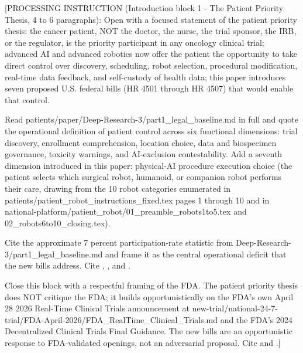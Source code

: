
[PROCESSING INSTRUCTION (Introduction block 1 - The Patient Priority
Thesis, 4 to 6 paragraphs): Open with a focused statement of the
patient priority thesis: the cancer patient, NOT the doctor, the
nurse, the trial sponsor, the IRB, or the regulator, is the priority
participant in any oncology clinical trial; advanced AI and advanced
robotics now offer the patient the opportunity to take direct control
over discovery, scheduling, robot selection, procedural modification,
real-time data feedback, and self-custody of health data; this paper
introduces seven proposed U.S. federal bills (HR 4501 through HR 4507)
that would enable that control.

Read patients/paper/Deep-Research-3/part1\_legal\_baseline.md in full
and quote the operational definition of patient control across six
functional dimensions: trial discovery, enrollment comprehension,
location choice, data and biospecimen governance, toxicity warnings,
and AI-exclusion contestability. Add a seventh dimension introduced
in this paper: physical-AI procedure execution choice (the patient
selects which surgical robot, humanoid, or companion robot performs
their care, drawing from the 10 robot categories enumerated in
patients/patient\_robot\_instructions\_fixed.tex pages 1 through 10 and
in national-platform/patient\_robot/01\_preamble\_robots1to5.tex and
02\_robots6to10\_closing.tex).

Cite the approximate 7 percent participation-rate statistic from
Deep-Research-3/part1\_legal\_baseline.md and frame it as the central
operational deficit that the new bills address. Cite
\cite{hhs_45cfr46_protection_human_subjects},
\cite{fda_informed_consent_guidance_2023}, and
\cite{fda_dct_guidance_2024}.

Close this block with a respectful framing of the FDA. The patient
priority thesis does NOT critique the FDA; it builds opportunistically
on the FDA's own April 28 2026 Real-Time Clinical Trials announcement
at new-trial/national-24-7-trial/FDA-April-2026/FDA\_RealTime\_Clinical\_Trials.md
and the FDA's 2024 Decentralized Clinical Trials Final Guidance. The
new bills are an opportunistic response to FDA-validated openings,
not an adversarial proposal. Cite \cite{fda_rtct_press_2026} and
\cite{fda_dct_guidance_2024}.]

